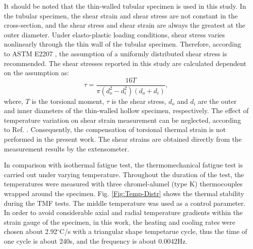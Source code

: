 \documentclass[preprint,5p,twocolumn,11pt,sort&compress]{elsarticle}
\begin{document}
It should be noted that the thin-walled tubular specimen is used in this study. In the tubular specimen, the shear strain and shear stress are not constant in the cross-section, and the shear stress and shear strain are always the greatest at the outer diameter. Under elasto-plastic loading conditions, shear stress varies nonlinearly through the thin wall of the tubular specimen. Therefore, according to ASTM E2207 \cite{ASTM2014}, the assumption of a uniformly distributed shear stress is recommended. The shear stresses reported in this study are calculated dependent on the assumption as:
\begin{equation}
\tau=\frac{16T}{\pi(d_o^2-d_i^2)(d_o+d_i)},
\end{equation}
where, $T$ is the torsional moment, $\tau$ is the shear stress, $d_o$ and $d_i$ are the outer and inner diameters of the thin-walled hollow specimen, respectively. The effect of temperature variation on shear strain measurement can be neglected, according to Ref. \cite{Bakis2014}. Consequently, the compensation of torsional thermal strain is not performed in the present work. The shear strains are obtained directly from the measurement results by the extensometer.


In comparison with isothermal fatigue test, the thermomechanical fatigue test is carried out under varying temperature. Throughout the duration of the test, the temperatures were measured with three chromel-alumel (type K) thermocouples wrapped around the specimen. Fig. \ref{Fig:Temp-Distr} shows the thermal stability during the TMF tests. The middle temperature was used as a control parameter. In order to avoid considerable axial and radial temperature gradients within the strain gauge of the specimen, in this work, the heating and cooling rates were chosen about 2.92$^\circ$C/s with a triangular shape tempetarue cycle, thus the time of one cycle is about 240s, and the frequency is about 0.0042Hz.
\end{document}

